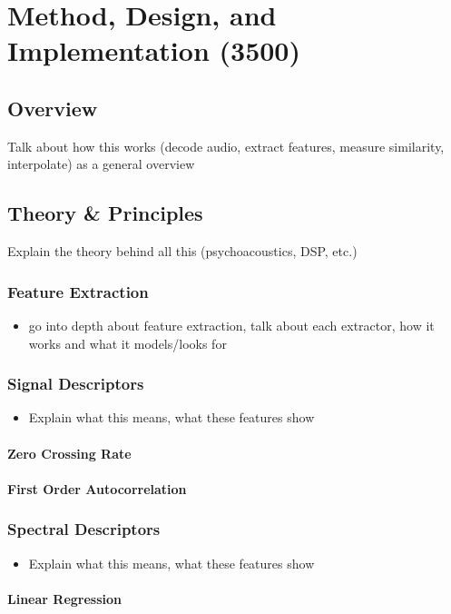 \chapter{Method, Design, and Implementation (3500)}
\section{Overview}
Talk about how this works (decode audio, extract features, measure similarity, interpolate) as a general overview
\section{Theory \& Principles}
Explain the theory behind all this (psychoacoustics, DSP, etc.)
\subsection{Feature Extraction}
\begin{itemize}
	\item go into depth about feature extraction, talk about each extractor, how it works and what it models/looks for
\end{itemize}
\subsection{Signal Descriptors}
\begin{itemize}
	\item Explain what this means, what these features show
\end{itemize}
\subsubsection{Zero Crossing Rate}
\subsubsection{First Order Autocorrelation}
\subsection{Spectral Descriptors}
\begin{itemize}
	\item Explain what this means, what these features show
\end{itemize}
\subsubsection{Linear Regression}
